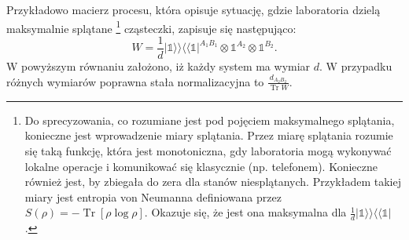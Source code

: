 \documentclass[10pt]{article} %
\DeclareMathOperator{\Trs}{Tr}
\newcommand{\Ket}[1]{|#1\rangle}
\newcommand{\Bra}[1]{\langle#1|}
\newcommand{\BBra}[1]{\langle\langle#1|}
\newcommand{\KKet}[1]{|#1\rangle\rangle}
\newcommand{\KP}{\Ket{\psi}}
\newcommand{\BP}{\Bra{\psi}}
\newcommand{\I}{\mathbb{1}}
\begin{document}
Przykładowo macierz procesu, która opisuje sytuację, gdzie laboratoria dzielą maksymalnie splątane
\footnote{Do sprecyzowania, co rozumiane jest pod pojęciem maksymalnego splątania, konieczne jest wprowadzenie miary splątania. Przez miarę splątania rozumie się taką funkcję, która jest monotoniczna, gdy laboratoria mogą wykonywać lokalne operacje i komunikować się klasycznie (np. telefonem). Konieczne również jest, by zbiegała do zera dla stanów niesplątanych. Przykładem takiej miary jest entropia von Neumanna definiowana przez $S(\rho) = -\Trs \left[ \rho \log \rho \right]$. Okazuje się, że jest ona maksymalna dla $\frac{1}{d}\KKet{\I}\BBra{\I}$ \cite{review}.
}
 cząsteczki, zapisuje się następująco:
\begin{equation}
W = \frac{1}{d}\KKet{\I}\BBra{\I}^{A_1B_1} \otimes \I^{A_2} \otimes \I^{B_2}.
\end{equation} W powyższym równaniu założono, iż każdy system ma wymiar $d$. W przypadku różnych wymiarów poprawna stała normalizacyjna to $\frac{d_{A_2B_2}}{\Trs W}$.
\end{document}

